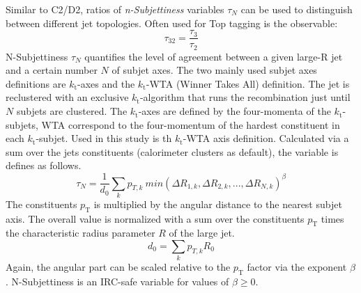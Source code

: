 Similar to C2/D2, ratios of \textit{n-Subjettiness} variables $\tau_N$ can be used to distinguish between different jet topologies. Often used for Top tagging is the observable: 
\begin{equation}
\tau_{32} = \frac{\tau_3}{\tau_2}  
\end{equation} 
N-Subjettiness $\tau_N$ quantifies the level of agreement between a given large-R jet and a certain number $N$ of subjet axes. The two mainly used subjet axes definitions are $k_\mathrm{t}$-axes and the $k_\mathrm{t}$-WTA (Winner Takes All) definition. The jet is reclustered with an exclusive $k_\mathrm{t}$-algorithm that runs the recombination just until $N$ subjets are clustered. The $k_\mathrm{t}$-axes are defined by the four-momenta of the $k_\mathrm{t}$-subjets, WTA correspond to the four-momentum of the hardest constituent in each $k_\mathrm{t}$-subjet. Used in this study is th $k_\mathrm{t}$-WTA axis definition. Calculated via a sum over the jets constituents (calorimeter clusters as default), the variable is defines as follows.
\begin{equation}
\tau_N = \frac{1}{d_0}\sum_k p_{T,k}\:min(\Delta R_{1,k},\Delta R_{2,k},...,\Delta R_{N,k})^{\beta}
\end{equation}
The constituents $p_{\mathrm{T}}$ is multiplied by the angular distance to the nearest subjet axis. The overall value is normalized with a sum over the constituents $p_{\mathrm{T}}$ times the characteristic radius parameter $R$ of the large jet.
\begin{equation}
d_0=\sum_k p_{T,k}R_0
\end{equation}
Again, the angular part can be scaled relative to the $p_{\mathrm{T}}$ factor via the exponent $\beta$. N-Subjettiness is an IRC-safe variable for values of $\beta \ge 0$.

